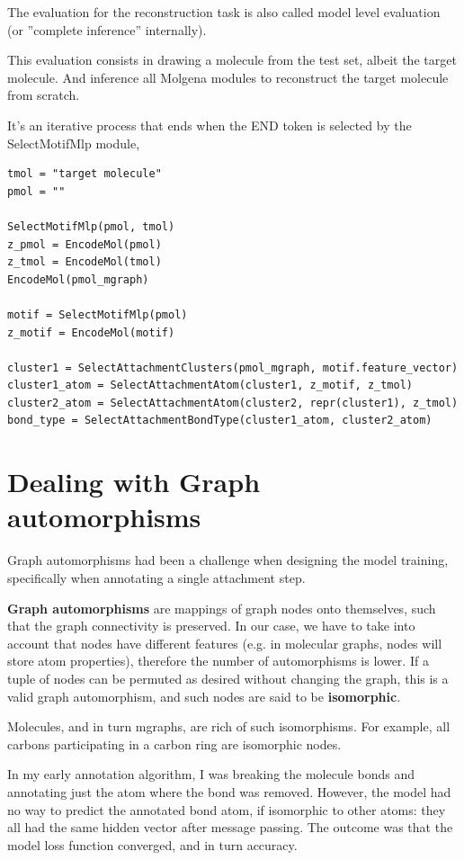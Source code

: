 \documentclass{article}
\begin{document}
The evaluation for the reconstruction task is also called model level evaluation (or ''complete inference'' internally).

This evaluation consists in drawing a molecule from the test set, albeit the target molecule.
And inference all Molgena modules to reconstruct the target molecule from scratch.

It's an iterative process that ends when the END token is selected by the SelectMotifMlp module, 

\begin{lstlisting}
tmol = "target molecule"
pmol = ""

SelectMotifMlp(pmol, tmol)
z_pmol = EncodeMol(pmol)
z_tmol = EncodeMol(tmol)
EncodeMol(pmol_mgraph)

motif = SelectMotifMlp(pmol)
z_motif = EncodeMol(motif)

cluster1 = SelectAttachmentClusters(pmol_mgraph, motif.feature_vector)
cluster1_atom = SelectAttachmentAtom(cluster1, z_motif, z_tmol)
cluster2_atom = SelectAttachmentAtom(cluster2, repr(cluster1), z_tmol)
bond_type = SelectAttachmentBondType(cluster1_atom, cluster2_atom)
\end{lstlisting}

\section{Dealing with Graph automorphisms}

Graph automorphisms had been a challenge when designing the model training, specifically when annotating a single attachment step.

\textbf{Graph automorphisms} are mappings of graph nodes onto themselves, such that the graph connectivity is preserved.
In our case, we have to take into account that nodes have different features (e.g. in molecular graphs, nodes will store atom properties),
therefore the number of automorphisms is lower.
If a tuple of nodes can be permuted as desired without changing the graph, this is a valid graph automorphism, and such nodes are said to be \textbf{isomorphic}.

Molecules, and in turn mgraphs, are rich of such isomorphisms.
For example, all carbons participating in a carbon ring are isomorphic nodes.

In my early annotation algorithm, I was breaking the molecule bonds and annotating just the atom where the bond was removed.
However, the model had no way to predict the annotated bond atom, if isomorphic to other atoms: they all had the same hidden vector after message passing.
The outcome was that the model loss function converged, and in turn accuracy.
\end{document}
